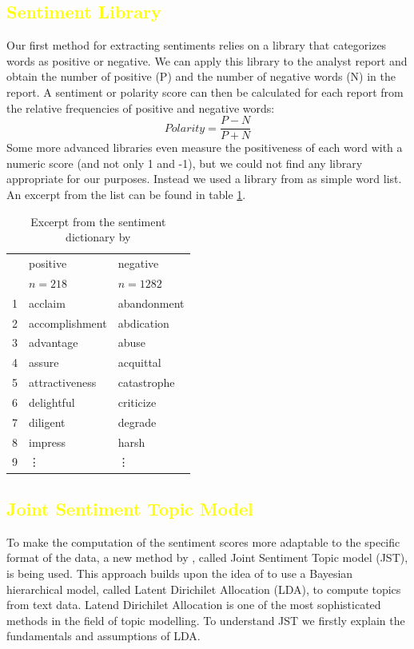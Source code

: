 \subsection{\textcolor{yellow}{Sentiment Library}}\label{BoW}
Our first method for extracting sentiments relies on a library that categorizes words as positive or negative. We can apply this library to the analyst report and obtain the number of positive (P) and the number of negative words (N) in the report. A sentiment or polarity score can then be calculated for each report from the relative frequencies of positive and negative words: 
\begin{equation}
    Polarity = \frac{P - N}{P + N}
\end{equation}
Some more advanced libraries even measure the positiveness of each word with a numeric score (and not only 1 and -1), but we could not find any library appropriate for our purposes. Instead we used a library from \citet{sent_dictionary} as simple word list. An excerpt from the list can be found in table \ref{tab:sent_dic}. 
\begin{table}[ht]
\centering
\begin{tabular}{rll}
  \hline
 & positive & negative \\ 
 & $n = 218$ & $n = 1282$ \\ 
  \hline
  1 & acclaim & abandonment \\ 
  2 & accomplishment & abdication \\ 
  3 & advantage & abuse \\ 
  4 & assure & acquittal \\ 
  5 & attractiveness & catastrophe \\ 
  6 & delightful & criticize \\ 
  7 & diligent & degrade \\ 
  8 & impress & harsh \\ 
  9 & \vdots & \vdots \\ 
   \hline
\end{tabular}
\caption{Excerpt from the sentiment dictionary by 
\citet{sent_dictionary}}
\label{tab:sent_dic}
\end{table}

\subsection{\textcolor{yellow}{Joint Sentiment Topic Model}}\label{JST}

To make the computation of the sentiment scores more adaptable to the specific format of the data, a new method by \citet{lin2009joint}, called Joint Sentiment Topic model (JST), is being used. This approach builds upon the idea of \citet{blei2003latent} to use a Bayesian hierarchical model, called Latent Dirichilet Allocation (LDA), to compute topics from text data. Latend Dirichilet Allocation is one of the most sophisticated methods in the field of topic modelling. To understand JST we firstly explain the fundamentals and assumptions of LDA. \\ 

